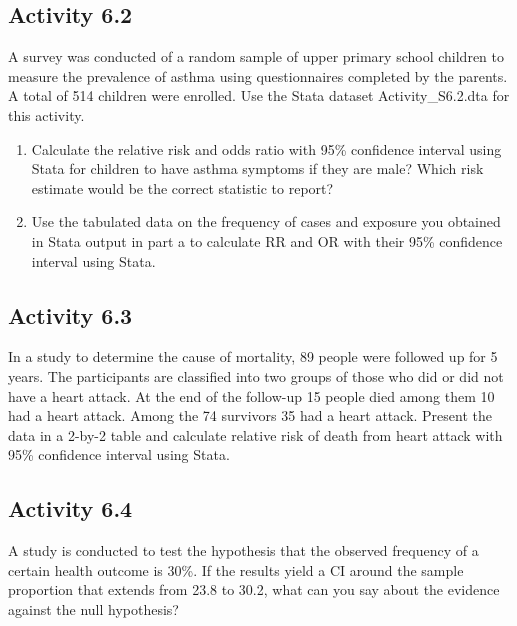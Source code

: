 \documentclass[
]{memoir}
\providecommand{\tightlist}{%
  \setlength{\itemsep}{0pt}\setlength{\parskip}{0pt}}
\begin{document}
\hypertarget{activity-6.2}{%
\subsection*{Activity 6.2}\label{activity-6.2}}

A survey was conducted of a random sample of upper primary school children to measure the prevalence of asthma using questionnaires completed by the parents. A total of 514 children were enrolled. Use the Stata dataset Activity\_S6.2.dta for this activity.

\begin{enumerate}
\def\labelenumi{\alph{enumi})}
\tightlist
\item
  Calculate the relative risk and odds ratio with 95\% confidence interval using Stata for children to have asthma symptoms if they are male? Which risk estimate would be the correct statistic to report?
\item
  Use the tabulated data on the frequency of cases and exposure you obtained in Stata output in part a to calculate RR and OR with their 95\% confidence interval using Stata.
\end{enumerate}

\hypertarget{activity-6.3}{%
\subsection*{Activity 6.3}\label{activity-6.3}}

In a study to determine the cause of mortality, 89 people were followed up for 5 years. The participants are classified into two groups of those who did or did not have a heart attack. At the end of the follow-up 15 people died among them 10 had a heart attack. Among the 74 survivors 35 had a heart attack. Present the data in a 2-by-2 table and calculate relative risk of death from heart attack with 95\% confidence interval using Stata.

\hypertarget{activity-6.4}{%
\subsection*{Activity 6.4}\label{activity-6.4}}

A study is conducted to test the hypothesis that the observed frequency of a certain health outcome is 30\%. If the results yield a CI around the sample proportion that extends from 23.8 to 30.2, what can you say about the evidence against the null hypothesis?
\end{document}
